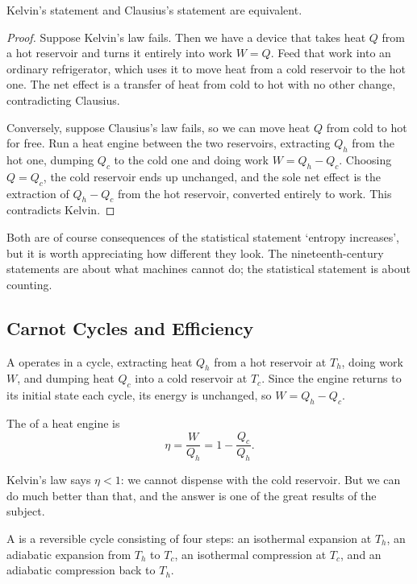 \documentclass[a4paper]{scrartcl}
\begin{document}
\begin{proposition}
	Kelvin's statement and Clausius's statement are equivalent.
\end{proposition}
\begin{proof}
	Suppose Kelvin's law fails. Then we have a device that takes heat $Q$ from a hot reservoir and turns it entirely into work $W = Q$. Feed that work into an ordinary refrigerator, which uses it to move heat from a cold reservoir to the hot one. The net effect is a transfer of heat from cold to hot with no other change, contradicting Clausius.

	Conversely, suppose Clausius's law fails, so we can move heat $Q$ from cold to hot for free. Run a heat engine between the two reservoirs, extracting $Q_h$ from the hot one, dumping $Q_c$ to the cold one and doing work $W = Q_h - Q_c$. Choosing $Q = Q_c$, the cold reservoir ends up unchanged, and the sole net effect is the extraction of $Q_h - Q_c$ from the hot reservoir, converted entirely to work. This contradicts Kelvin.
\end{proof}

Both are of course consequences of the statistical statement `entropy increases', but it is worth appreciating how different they look. The nineteenth-century statements are about what machines cannot do; the statistical statement is about counting.

\subsection{Carnot Cycles and Efficiency}

A  operates in a cycle, extracting heat $Q_h$ from a hot reservoir at $T_h$, doing work $W$, and dumping heat $Q_c$ into a cold reservoir at $T_c$. Since the engine returns to its initial state each cycle, its energy is unchanged, so $W = Q_h - Q_c$.

\begin{definition}[Efficiency]
	The  of a heat engine is
	$$
	\eta = \frac{W}{Q_h} = 1 - \frac{Q_c}{Q_h}.
	$$
\end{definition}

Kelvin's law says $\eta < 1$: we cannot dispense with the cold reservoir. But we can do much better than that, and the answer is one of the great results of the subject.

\begin{definition}
	A  is a reversible cycle consisting of four steps: an isothermal expansion at $T_h$, an adiabatic expansion from $T_h$ to $T_c$, an isothermal compression at $T_c$, and an adiabatic compression back to $T_h$.
\end{definition}
\end{document}
